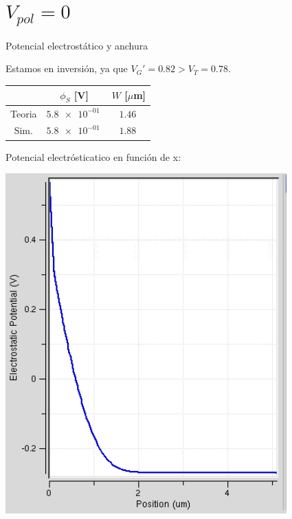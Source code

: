 \documentclass{/home/daniel/GitHub/USC-Physics-Degree-Notes/Notes/Presentacion}
\begin{document}
\section{$V_{pol}=0$} 

\begin{frame}{Potencial electrostático y anchura}
    \begin{minipage}{0.4\linewidth}
        Estamos en inversión, ya que $V_G'=0.82>V_T=0.78$.
        
        \vspace*{1em}
        
        \begin{center}
            \small
            \begin{tabular}{ccc}
                \toprule
                & $\phi_S$ [V] & $W$ [$\mu$m]   \\ \midrule
                Teoria & $\SI{5.8e-01}{}$ & $\SI{1.46}{}$ \\
                Sim.   & $\SI{5.8e-01}{}$ & $\SI{1.88}{}$  \\
                \bottomrule
            \end{tabular}
        \end{center}
    \end{minipage}
    \hfill
    \begin{minipage}{0.55\linewidth} \centering
        Potencial electrósticatico en función de x:

        \vspace*{1em}
        
        \includegraphics[width=0.7\linewidth]{../Imagenes/0-Potencial.png}
    \end{minipage}
\end{frame}
\end{document}
